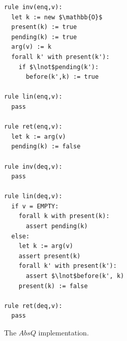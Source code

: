 \begin{figure}[t]
\begin{minipage}[b]{0.4\linewidth}
\begin{lstlisting}
rule inv(enq,v):
  let k := new $\mathbb{O}$
  present(k) := true
  pending(k) := true
  arg(v) := k
  forall k' with present(k'):
    if $\lnot$pending(k'):
      before(k',k) := true

rule lin(enq,v):
  pass

rule ret(enq,v):
  let k := arg(v)
  pending(k) := false

rule inv(deq,v):
  pass

rule lin(deq,v):
  if v = EMPTY:
    forall k with present(k):
      assert pending(k)
  else:
    let k := arg(v)
    assert present(k)
    forall k' with present(k'):
      assert $\lnot$before(k', k)
    present(k) := false

rule ret(deq,v):
  pass
    \end{lstlisting}
    \caption{The $AbsQ$ implementation.}
    \label{fig:transitions:AbsQ}
  \end{minipage}
\end{figure}

